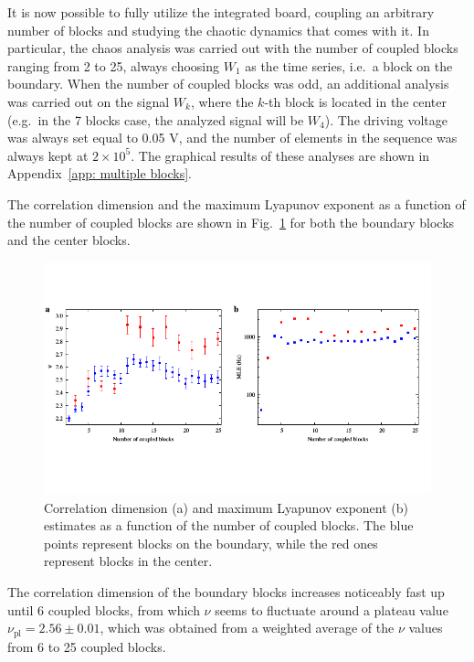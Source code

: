 It is now possible to fully utilize the integrated board, coupling an arbitrary number
of blocks and studying the chaotic dynamics that comes with it.
In particular, the chaos analysis was carried out with the number of coupled blocks ranging from
2 to 25, always choosing $W_1$ as the time series, i.e.\ a block on the boundary.
When the number of coupled blocks was odd, an additional analysis was carried out on the signal $W_k$,
where the $k$-th block is located in the center (e.g.\ in the 7 blocks case,
the analyzed signal will be $W_4$). The driving voltage was always set equal to 0.05 V, and the
number of elements in the sequence was always kept at $2\times10^5$.
The graphical results of these analyses are shown in Appendix~\ref{app: multiple blocks}.

The correlation dimension and the maximum Lyapunov exponent as a function of the number of coupled
blocks are shown in Fig.~\ref{fig:nu mle blocks} for both the boundary blocks and the center blocks.

\begin{figure}[!htbp]
    \centering
    \includegraphics[width=\linewidth,trim={0 1.5cm 0 1.3cm},clip]
    {../blocks/data/nu_mle_blocks.pdf}
    \caption{Correlation dimension (a) and maximum Lyapunov exponent (b) estimates
    as a function of the number of coupled blocks. The blue points represent blocks on the boundary,
    while the red ones represent blocks in the center.}\label{fig:nu mle blocks}
\end{figure}

The correlation dimension of the boundary blocks increases noticeably fast up until 6 coupled blocks,
from which $\nu$ seems to fluctuate around a plateau value $\nu_{\text{pl}}=2.56\pm0.01$, which was
obtained from a weighted average of the $\nu$ values from 6 to 25 coupled blocks.

